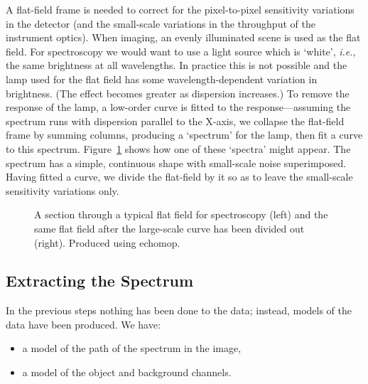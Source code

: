 \documentclass[twoside,11pt]{article}
\newcommand{\htmlref}[2]{#1}
\newcommand{\xref}[3]{#1}
\newcommand{\xlabel}[1]{}
\newcommand{\mlabel}[1]{\xlabel{#1}\label{#1}}
\newcommand{\scspec}[2]{#1}
\newcommand{\scspec}[2]{#2}
\begin{document}
A \htmlref{flat-field}{gl_flat_field} frame is needed to correct for the
pixel-to-pixel sensitivity variations in the detector (and the small-scale
variations in the throughput of the instrument optics).
When imaging, an evenly illuminated scene is used as the flat field.
For spectroscopy we would want to use a light source
which is `white', {\it{i.e.}}, the same brightness at all wavelengths.
In practice this is not possible and the lamp used for the flat
field has some wavelength-dependent variation in brightness.  (The effect
becomes greater as dispersion increases.)  To remove the response
of the lamp, a low-order curve is fitted to the
response\scspec{---}{ - }assuming the spectrum runs with dispersion parallel
to the X-axis, we collapse the flat-field frame by summing columns, producing
a `spectrum' for the lamp, then fit a curve to this spectrum.
\scspec{Figure~\ref{fi_flat_field}}{The figure below}
shows how one of these `spectra' might appear.
The spectrum has a simple, continuous shape with small-scale noise
superimposed.
Having fitted a curve, we divide the flat-field by it so as to leave
the small-scale sensitivity variations only.

\begin{figure}
\begin{center}
  \scspec{\leavevmode\epsfysize=55mm\epsfbox{sc7_06.eps}}
         {\leavevmode\epsfysize=66mm}

  \parbox{140mm}{
    \caption{A section through a typical flat field for spectroscopy
             (left) and the same flat field after the large-scale
	     curve has been divided out (right).  Produced using
	     \xref{{\sc echomop}}{sun152}{}.}
    \label{fi_flat_field}
  }
\end{center}
\end{figure}


\subsection{\mlabel{extraction}Extracting the Spectrum}

In the previous steps nothing has been done to the data;
instead, models of the data have been produced.  We have:

\begin{itemize}

\item a model of the path of the spectrum in the image,

\item a model of the object and background channels.

\end{itemize}
\end{document}
